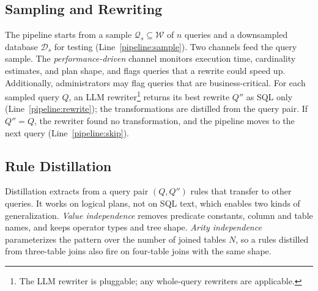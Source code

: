 \vspace{-0.1cm}
\subsection{Sampling and Rewriting}
\label{sec:offline:sample}
The pipeline starts from a sample $\mathcal{Q}_s \subseteq \mathcal{W}$ of $n$ queries and a downsampled database $\mathcal{D}_s$ for testing (Line~\ref{pipeline:sample}).
Two channels feed the query sample.
The \emph{performance-driven} channel monitors execution time, cardinality estimates, and plan shape, and flags queries that a rewrite could speed up. Additionally, administrators may flag queries that are business-critical.
For each sampled query $Q$, an LLM rewriter\footnote{The LLM rewriter is pluggable; any whole-query rewriters \cite{GenRewrite,resequel} are applicable.} returns its best rewrite $Q''$ as SQL only (Line~\ref{pipeline:rewrite}); the transformations are distilled from the query pair.
If $Q'' = Q$, the rewriter found no transformation, and the pipeline moves to the next query (Line~\ref{pipeline:skip}).


\subsection{Rule Distillation}
\label{sec:offline:distill}
Distillation extracts from a query pair $(Q, Q'')$ rules that transfer to other queries.
It works on logical plans, not on SQL text, which enables two kinds of generalization.
\emph{Value independence} removes predicate constants, column and table names, and keeps operator types and tree shape.
\emph{Arity independence} parameterizes the pattern over the number of joined tables $N$, so a rules distilled from three-table joins also fire on four-table joins with the same shape.

